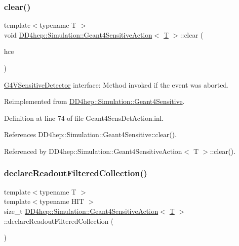 \subsubsection{\texorpdfstring{clear()}{clear()}\hspace{0.1cm}{\footnotesize\ttfamily [3/3]}}
{\footnotesize\ttfamily template$<$typename T $>$ \\
void \hyperlink{class_d_d4hep_1_1_simulation_1_1_geant4_sensitive_action}{D\+D4hep\+::\+Simulation\+::\+Geant4\+Sensitive\+Action}$<$ \hyperlink{class_t}{T} $>$\+::clear (\begin{DoxyParamCaption}\item[{G4\+H\+Cof\+This\+Event $\ast$}]{hce }\end{DoxyParamCaption})\hspace{0.3cm}{\ttfamily [virtual]}}



\hyperlink{class_g4_v_sensitive_detector}{G4\+V\+Sensitive\+Detector} interface\+: Method invoked if the event was aborted. 



Reimplemented from \hyperlink{class_d_d4hep_1_1_simulation_1_1_geant4_sensitive_a3bb1c2f79261a98e83ec22102281d117}{D\+D4hep\+::\+Simulation\+::\+Geant4\+Sensitive}.



Definition at line 74 of file Geant4\+Sens\+Det\+Action.\+inl.



References D\+D4hep\+::\+Simulation\+::\+Geant4\+Sensitive\+::clear().



Referenced by D\+D4hep\+::\+Simulation\+::\+Geant4\+Sensitive\+Action$<$ T $>$\+::clear().

\hypertarget{class_d_d4hep_1_1_simulation_1_1_geant4_sensitive_action_a8eba94d693db1402e48eec8a7522a235}{}\label{class_d_d4hep_1_1_simulation_1_1_geant4_sensitive_action_a8eba94d693db1402e48eec8a7522a235} 
\subsubsection{\texorpdfstring{declare\+Readout\+Filtered\+Collection()}{declareReadoutFilteredCollection()}}
{\footnotesize\ttfamily template$<$typename T $>$ \\
template$<$typename H\+IT $>$ \\
size\+\_\+t \hyperlink{class_d_d4hep_1_1_simulation_1_1_geant4_sensitive_action}{D\+D4hep\+::\+Simulation\+::\+Geant4\+Sensitive\+Action}$<$ \hyperlink{class_t}{T} $>$\+::declare\+Readout\+Filtered\+Collection (\begin{DoxyParamCaption}{ }\end{DoxyParamCaption})}




